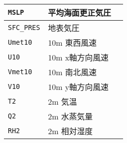 {\begin{table}[tbh]
\begin{center}
\begin{tabularx}{150mm}{llX}
\verb|MSLP| & 平均海面更正気圧 & \\ \hline
\verb|SFC_PRES| & 地表気圧 & \\ \hline
\verb|Umet10| & 10m 東西風速 & \\ \hline
\verb|U10| & 10m x軸方向風速 & \\ \hline
\verb|Vmet10| & 10m 南北風速 & \\ \hline
\verb|V10| & 10m y軸方向風速 & \\ \hline
\verb|T2| & 2m 気温 & \\ \hline
\verb|Q2| & 2m 水蒸気量 & \\ \hline
\verb|RH2| & 2m 相対湿度 & \\ \hline
\end{tabularx}
\end{center}
\end{table}

}
